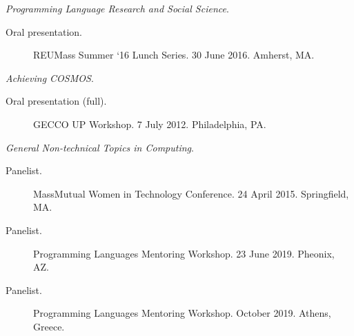 \documentclass[10pt]{article}
\begin{document}
{    \emph{Programming Language Research and Social Science}.
    \begin{description}
      \item[Oral presentation.] REUMass Summer `16 Lunch Series. 30 June 2016.  Amherst, MA.
    \end{description}
    \vspace{10pt}
    \emph{Achieving COSMOS}.
    \begin{description}
    \item[Oral presentation (full).]  GECCO UP Workshop. 7 July 2012. Philadelphia, PA.
    \end{description}
    \vspace{10pt}
    \emph{General Non-technical Topics in Computing}.
    \begin{description}
      \item[Panelist.] MassMutual Women in Technology Conference. 24 April 2015. Springfield, MA.
      \item[Panelist.] Programming Languages Mentoring Workshop. 23 June 2019. Pheonix, AZ.
      \item[Panelist.] Programming Languages Mentoring Workshop. October 2019. Athens, Greece.
    \end{description}
}
\end{document}
